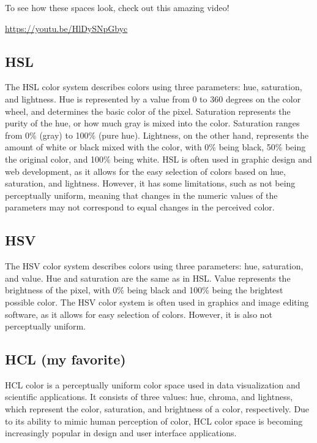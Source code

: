 \documentclass[
  letterpaper,
]{book}
\begin{document}
To see how these spaces look, check out this amazing video!

\url{https://youtu.be/HlDySNpGbyc}

\hypertarget{hsl}{%
\subsection{HSL}\label{hsl}}

The HSL color system describes colors using three parameters: hue,
saturation, and lightness. Hue is represented by a value from 0 to 360
degrees on the color wheel, and determines the basic color of the pixel.
Saturation represents the purity of the hue, or how much gray is mixed
into the color. Saturation ranges from 0\% (gray) to 100\% (pure hue).
Lightness, on the other hand, represents the amount of white or black
mixed with the color, with 0\% being black, 50\% being the original
color, and 100\% being white. HSL is often used in graphic design and
web development, as it allows for the easy selection of colors based on
hue, saturation, and lightness. However, it has some limitations, such
as not being perceptually uniform, meaning that changes in the numeric
values of the parameters may not correspond to equal changes in the
perceived color.

\hypertarget{hsv}{%
\subsection{HSV}\label{hsv}}

The HSV color system describes colors using three parameters: hue,
saturation, and value. Hue and saturation are the same as in HSL. Value
represents the brightness of the pixel, with 0\% being black and 100\%
being the brightest possible color. The HSV color system is often used
in graphics and image editing software, as it allows for easy selection
of colors. However, it is also not perceptually uniform.

\hypertarget{hcl-my-favorite}{%
\subsection{HCL (my favorite)}\label{hcl-my-favorite}}

HCL color is a perceptually uniform color space used in data
visualization and scientific applications. It consists of three values:
hue, chroma, and lightness, which represent the color, saturation, and
brightness of a color, respectively. Due to its ability to mimic human
perception of color, HCL color space is becoming increasingly popular in
design and user interface applications.
\end{document}
